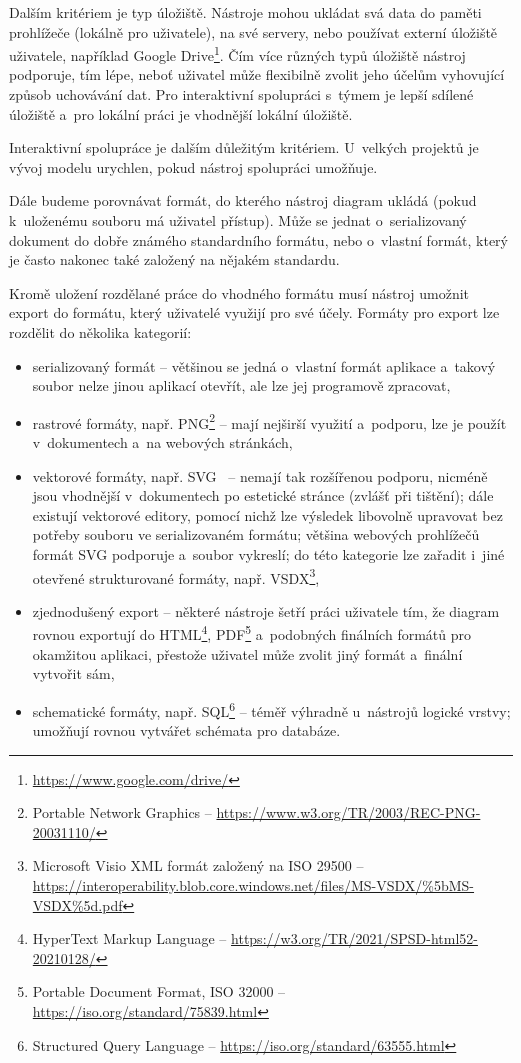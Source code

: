 Dalším kritériem je typ úložiště.
Nástroje mohou ukládat svá data do paměti prohlížeče (lokálně pro uživatele), na své servery, nebo používat externí úložiště uživatele, například Google Drive\footnote{\url{https://www.google.com/drive/}}.
Čím více různých typů úložiště nástroj podporuje, tím lépe, neboť uživatel může flexibilně zvolit jeho účelům vyhovující způsob uchovávání dat.
Pro interaktivní spolupráci s~týmem je lepší sdílené úložiště a~pro lokální práci je vhodnější lokální úložiště.

Interaktivní spolupráce je dalším důležitým kritériem.
U~velkých projektů je vývoj modelu urychlen, pokud nástroj spolupráci umožňuje.

Dále budeme porovnávat formát, do kterého nástroj diagram ukládá (pokud k~uloženému souboru má uživatel přístup).
Může se jednat o~serializovaný dokument do dobře známého standardního formátu, nebo o~vlastní formát, který je často nakonec také založený na nějakém standardu.

Kromě uložení rozdělané práce do vhodného formátu musí nástroj umožnit export do formátu, který uživatelé využijí pro své účely.
Formáty pro export lze rozdělit do několika kategorií:
\begin{itemize}
  \item serializovaný formát -- většinou se jedná o~vlastní formát aplikace a~takový soubor nelze jinou aplikací otevřít, ale lze jej programově zpracovat,
  \item rastrové formáty, např. PNG\footnote{Portable Network Graphics -- \url{https://www.w3.org/TR/2003/REC-PNG-20031110/}} -- mají nejširší využití a~podporu, lze je použít v~dokumentech a~na webových stránkách,
  \item vektorové formáty, např. SVG~\cite{brinza_svg_2018} -- nemají tak rozšířenou podporu, nicméně jsou vhodnější v~dokumentech po estetické stránce (zvlášť při tištění);
        dále existují vektorové editory, pomocí nichž lze výsledek libovolně upravovat bez potřeby souboru ve serializovaném formátu;
        většina webových prohlížečů formát SVG podporuje a~soubor vykreslí;
        do této kategorie lze zařadit i~jiné otevřené strukturované formáty, např. VSDX\footnote{Microsoft Visio XML formát založený na ISO 29500 -- \url{https://interoperability.blob.core.windows.net/files/MS-VSDX/\%5bMS-VSDX\%5d.pdf}},
  \item zjednodušený export -- některé nástroje šetří práci uživatele tím, že diagram rovnou exportují do HTML\footnote{HyperText Markup Language -- \url{https://w3.org/TR/2021/SPSD-html52-20210128/}}, PDF\footnote{Portable Document Format, ISO 32000 -- \url{https://iso.org/standard/75839.html}} a~podobných finálních formátů pro okamžitou aplikaci, přestože uživatel může zvolit jiný formát a~finální vytvořit sám,
  \item schematické formáty, např. SQL\footnote{Structured Query Language -- \url{https://iso.org/standard/63555.html}} -- téměř výhradně u~nástrojů lo\-gic\-ké vrst\-vy; umožňují rovnou vytvářet schémata pro databáze.
\end{itemize}


